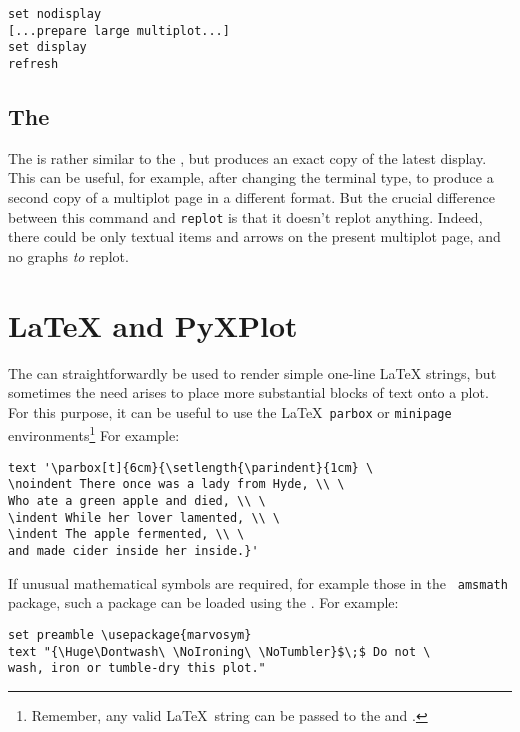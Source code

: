 \begin{verbatim} 
set nodisplay
[...prepare large multiplot...]
set display
refresh
\end{verbatim}

\subsection{The }

 The  is rather similar to the
, but produces an exact copy of the latest display. This can be
useful, for example, after changing the terminal type, to produce a second copy
of a multiplot page in a different format. But the crucial difference between
this command and {\tt replot} is that it doesn't replot anything. Indeed, there
could be only textual items and arrows on the present multiplot page, and no
graphs {\it to} replot.

\section{LaTeX and PyXPlot}

The  can straightforwardly be used to render simple one-line
\LaTeX{} strings, but sometimes the need arises to place more
substantial blocks of text onto a plot. For this purpose, it can be useful to
use the \LaTeX\ {\tt parbox} or {\tt minipage} environments\footnote{Remember,
any valid \LaTeX\ string can be passed to the  and .} For example:

\begin{verbatim} 
text '\parbox[t]{6cm}{\setlength{\parindent}{1cm} \
\noindent There once was a lady from Hyde, \\ \
Who ate a green apple and died, \\ \
\indent While her lover lamented, \\ \
\indent The apple fermented, \\ \
and made cider inside her inside.}'
\end{verbatim}

If unusual mathematical symbols are required, for example those in the {\tt
amsmath} package, such a package
can be loaded using the . For example:

\begin{verbatim} 
set preamble \usepackage{marvosym}
text "{\Huge\Dontwash\ \NoIroning\ \NoTumbler}$\;$ Do not \
wash, iron or tumble-dry this plot."
\end{verbatim}

